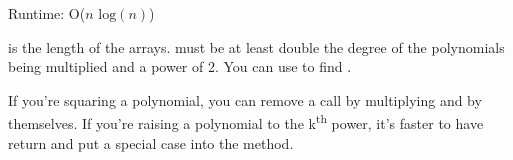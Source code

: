 
Runtime: O($n\text{ log}(n)$)

 is the length of the arrays.  must be at least double the degree of the polynomials being multiplied and a power of 2. You can use  to find .

If you're squaring a polynomial, you can remove a  call by multiplying  and  by themselves. If you're raising a polynomial to the k\textsuperscript{th} power, it's faster to have  return  and put a special case into the  method.





\newpage